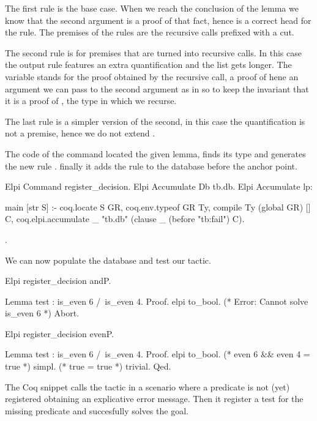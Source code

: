 \documentclass[a4paper, 11pt]{book}
\begin{document}
The first rule is the base case. When we reach the conclusion of the lemma
 we know that the second argument 
is a proof of that fact, hence  is a correct head for the
rule. The premises of the rules are the  recursive calls
prefixed with a cut.

The second rule is for premises that are turned into recursive calls. In this
case the output rule features an extra  quantification and the
 list gets longer. The  variable stands for
the proof obtained by the recursive call, a proof of 
hene an argument we can pass to the second argument as in 
so to keep the invariant that it is a proof of , the type
in which we recurse.

The last rule is a simpler version of the second, in this case the quantification
is not a premise, hence we do not extend .

The code of the  command located the
given lemma, finds its type and generates the new rule .
finally it adds the rule to the database before the 
anchor point.

\begin{coqcode}
Elpi Command register_decision.
Elpi Accumulate Db tb.db.
Elpi Accumulate lp:{{
    
main [str S] :-
  coq.locate S GR,
  coq.env.typeof GR Ty,
  compile Ty (global GR) [] C,
  coq.elpi.accumulate _ "tb.db" (clause _ (before "tb:fail") C).

}}.
\end{coqcode}

We can now populate the database and test our tactic.

\begin{coqcode}
Elpi register_decision andP.

Lemma test : is_even 6 /\ is_even 4.
Proof.
elpi to_bool. (* Error: Cannot solve is_even 6 *)
Abort.

Elpi register_decision evenP.

Lemma test : is_even 6 /\ is_even 4.
Proof.
elpi to_bool. (* even 6 && even 4 = true *)
simpl.        (* true = true *)
trivial.
Qed.
\end{coqcode}
  
The Coq snippet calls the  tactic in a scenario
where a predicate is not (yet) registered obtaining an explicative
error message. Then it register a test for the missing predicate
and succesfully solves the goal.
\end{document}
